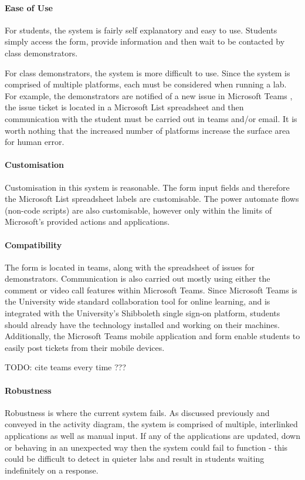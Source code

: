 \documentclass[a4paper,11pt]{article}
\begin{document}
\paragraph{Ease of Use} 
For students, the system is fairly self explanatory and easy to use. Students simply access the form, provide information and then wait to be contacted by class demonstrators.

For class demonstrators, the system is more difficult to use. Since the system is comprised of multiple platforms, each must be considered when running a lab. For example, the demonstrators are notified of a new issue in Microsoft Teams \cite{teams}, the issue ticket is located in a Microsoft List spreadsheet and then communication with the student must be carried out in teams and/or email. It is worth nothing that the increased number of platforms increase the surface area for human error.


\paragraph{Customisation} 
Customisation in this system is reasonable. The form input fields and therefore the Microsoft List spreadsheet labels are customisable. The power automate \cite{pauto} flows (non-code scripts) are also customisable, however only within the limits of Microsoft's provided actions and applications.

\paragraph{Compatibility}  
The form is located in teams, along with the spreadsheet of issues for demonstrators. Communication is also carried out mostly using either the comment or video call features within Microsoft Teams. Since Microsoft Teams is the University wide standard collaboration tool for online learning, and is integrated with the University's Shibboleth \cite{shib} single sign-on platform, students should already have the technology installed and working on their machines. Additionally, the Microsoft Teams mobile application and form enable students to easily post tickets from their mobile devices.

TODO: cite teams every time ???

\paragraph{Robustness}
Robustness is where the current system fails. As discussed previously and conveyed in the activity diagram, the system is comprised of multiple, interlinked applications as well as manual input. If any of the applications are updated, down or behaving in an unexpected way then the system could fail to function - this could be difficult to detect in quieter labs and result in students waiting indefinitely on a response.
\end{document}
